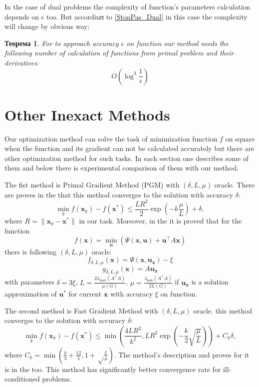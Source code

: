 \documentclass[12pt]{article}
\newtheorem{theorem}{Теорема}[section]
\begin{document}
In the case of dual problems the complexity of function's parameters calculation depends on $\epsilon$ too. But accordinп to \ref{StonPas_Dual} in this case the complexity will change by obvious way:

\begin{theorem}
For to approach accuracy $\epsilon$ on function our method needs the following number of calculation of functions from primal problem and their derivatives:
$$O(\log^3\frac{1}{\epsilon})$$
\end{theorem} 

\section{Other Inexact Methods}
\label{Inexact}

Our optimization method can solve the task of minimization function $f$ on square when the function and its gradient can not be calculated accurately but there are other optimization method for such tasks. In each section one describes some of them and below there is experimental comparison of them with our method.

The fist method is Primal Gradient Method (PGM) with $(\delta, L,\mu)$ oracle. There are proves in the \cite{PGM} that this method converges to the solution with accuracy $\delta$:
$$\min_k f(\textbf{x}_k) - f(\textbf{x}^*) \leq \frac{LR^2}{2}\exp\left(-k\frac{\mu}{L}\right) + \delta,$$
where $R = \|\textbf{x}_0-\textbf{x}^*\|$ in our task. Moreover, in the \cite{PGM} it is proved that for the function
$$f(\textbf{x}) = \min\limits_\textbf{u} \left(\Psi(\textbf{x},\textbf{u}) + \textbf{u}^\top A\textbf{x}\right)$$
there is following $(\delta, L,\mu)$ oracle:
$$f_{\delta, L,\mu}(\textbf{x}) = \Psi(\textbf{x}, \textbf{u}_\textbf{x}) - \xi$$
$$g_{\delta, L,\mu}(\textbf{x}) = A\textbf{u}_\textbf{x}$$
with parameters $\delta = 3\xi$, $L = \frac{2\lambda_{\max}(A^\top A)}{\mu(G)}$, $\mu = \frac{\lambda_{\min}(A^\top A)}{2L(G)}$ if $\textbf{u}_\textbf{x}$ is a solution approximation of $\textbf{u}^*$ for current $\textbf{x}$ with accuracy $\xi$ on function.

The second method is Fast Gradient Method with $(\delta, L,\mu)$ oracle.
this method converges to the solution with accuracy $\delta$:
$$\min_k f(\textbf{x}_k) - f(\textbf{x}^*) \leq \min\left(\frac{4LR^2}{k^2}, LR^2\exp\left(-\frac{k}{2}\sqrt{\frac{\mu}{L}}\right)\right) + C_k\delta,$$
where $C_k = \min\left(\frac{k}{3}+\frac{12}{5}, 1+\sqrt\frac{L}{\mu}\right)$. The method's description and proves for it is in the \cite{PGM} too. This method has significantly better convergence rate for  ill-conditioned problems.
\end{document}

